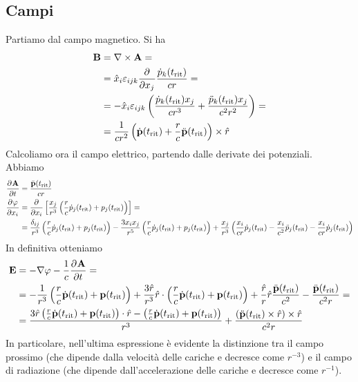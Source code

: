 \documentclass[a4paper,11pt]{article}
\renewcommand{\vec}[1]{\mathbf{#1}}
\renewcommand{\t}{t_{\mathrm{rit}}}
\begin{document}
\subsection{Campi}
Partiamo dal campo magnetico. Si ha
\begin{align*}\vec{B}&=\nabla\times\vec{A}=\\&=\hat{x}_i\varepsilon_{ijk}\pder{}{x_j}\frac{\dot{p}_k(\t)}{cr}=\\&=-\hat{x}_i\varepsilon_{ijk}\left(\frac{\dot{p}_k(\t)x_j}{cr^3}+\frac{\ddot{p}_k(\t)x_j}{c^2r^2}\right)=\\&=\frac{1}{cr^2}\left(\dot{\vec{p}}(\t)+\frac{r}{c}\ddot{\vec{p}}(\t)\right)\times\hat{r}\end{align*}
Calcoliamo ora il campo elettrico, partendo dalle derivate dei potenziali. Abbiamo
\begin{align*}\pder{\vec{A}}{t}&=\frac{\ddot{\vec{p}}(\t)}{cr}\\\pder{\varphi}{x_i}&=\pder{}{x_i}\left[\frac{x_j}{r^3}\left(\frac{r}{c}\dot{p}_j(\t)+p_j(\t)\right)\right]=\\&=\frac{\delta_{ij}}{r^3}\left(\frac{r}{c}\dot{p}_j(\t)+p_j(\t)\right)-\frac{3x_ix_j}{r^5}\left(\frac{r}{c}\dot{p}_j(\t)+p_j(\t)\right)+\frac{x_j}{r^3}\left(\frac{x_i}{cr}\dot{p}_j(\t)-\frac{x_i}{c^2}\ddot{p}_j(\t)-\frac{x_i}{cr}\dot{p}_j(\t)\right)\end{align*}
In definitiva otteniamo
\begin{align*}\vec{E}&=-\nabla\varphi-\frac{1}{c}\pder{\vec{A}}{t}=\\&=-\frac{1}{r^3}\left(\frac{r}{c}\dot{\vec{p}}(\t)+\vec{p}(\t)\right)+\frac{3\hat{r}}{r^3}\hat{r}\cdot\left(\frac{r}{c}\dot{\vec{p}}(\t)+\vec{p}(\t)\right)+\frac{\hat{r}}{r}\hat{r}\frac{\ddot{\vec{p}}(\t)}{c^2}-\frac{\ddot{\vec{p}}(\t)}{c^2r}=\\&=\frac{3\hat{r}\left(\frac{r}{c}\dot{\vec{p}}(\t)+\vec{p}(\t)\right)\cdot\hat{r}-\left(\frac{r}{c}\dot{\vec{p}}(\t)+\vec{p}(\t)\right)}{r^3}+\frac{\left(\ddot{\vec{p}}(\t)\times\hat{r}\right)\times\hat{r}}{c^2r}\end{align*}
In particolare, nell'ultima espressione è evidente la distinzione tra il campo prossimo (che dipende dalla velocità delle cariche e decresce come $r^{-3}$) e il campo di radiazione (che dipende dall'accelerazione delle cariche e decresce come $r^{-1}$).
\end{document}
